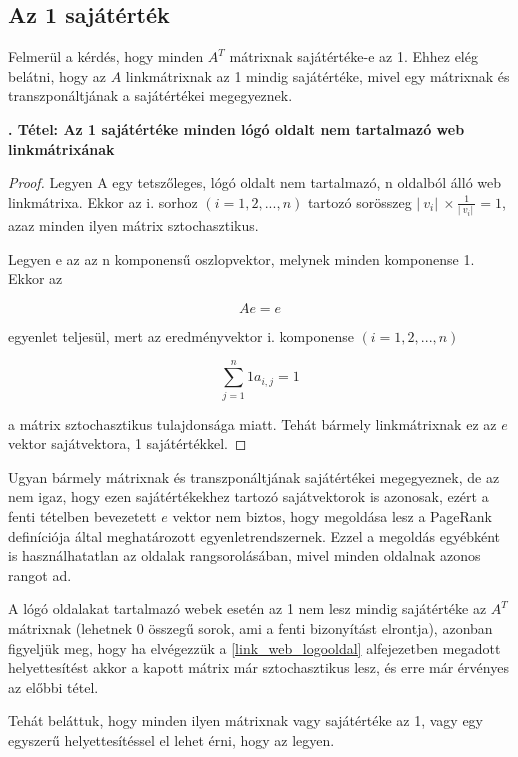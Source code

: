 \documentclass[12pt,a4paper]{article}
\newcounter{tszam}
\newenvironment{tetel}[1]
{{\medskip}\noindent \stepcounter{tszam}
{\bfseries{\thetszam. Tétel: #1\\[1ex]}}}{\bigskip }
\begin{document}
\subsection{Az 1 sajátérték}\label{egy_sajatertek}

Felmerül a kérdés, hogy minden $A^T$ mátrixnak sajátértéke-e az 1. Ehhez elég belátni, hogy az $A$ linkmátrixnak az 1 mindig sajátértéke, mivel egy mátrixnak és transzponáltjának a sajátértékei megegyeznek.

\begin{tetel}{Az 1 sajátértéke minden lógó oldalt nem tartalmazó web linkmátrixának}
\end{tetel}
\vspace{-1cm}
\begin{proof}
	Legyen A egy tetszőleges, lógó oldalt nem tartalmazó, n oldalból álló web linkmátrixa. Ekkor az i. sorhoz $(i = 1,2,...,n)$ tartozó sorösszeg $ |\ v_i |\ \times \frac{1}{|\ v_i |\ } = 1 $, azaz minden ilyen mátrix sztochasztikus.
	
	Legyen e az az n komponensű oszlopvektor, melynek minden komponense 1. Ekkor az
	
	\[ A e = e \] 
	
	egyenlet teljesül, mert az eredményvektor i. komponense $(i = 1,2,...,n)$
	
	\[ \sum_{j=1}^{n}{1 a_{i,j} } = 1 \] 
	
	a mátrix sztochasztikus tulajdonsága miatt. Tehát bármely linkmátrixnak ez az $e$ vektor sajátvektora, 1 sajátértékkel.
	
\end{proof}
\vspace{0.5cm}

Ugyan bármely mátrixnak és transzponáltjának sajátértékei megegyeznek, de az nem igaz, hogy ezen sajátértékekhez tartozó sajátvektorok is azonosak, ezért a fenti tételben bevezetett $e$ vektor nem biztos, hogy megoldása lesz a PageRank definíciója által meghatározott egyenletrendszernek. Ezzel a megoldás egyébként is használhatatlan az oldalak rangsorolásában, mivel minden oldalnak azonos rangot ad.

A lógó oldalakat tartalmazó webek esetén az 1 nem lesz mindig sajátértéke az $A^T$ mátrixnak (lehetnek 0 összegű sorok, ami a fenti bizonyítást elrontja), azonban figyeljük meg, hogy ha elvégezzük a \ref{link_web_logooldal} alfejezetben megadott helyettesítést akkor a kapott mátrix már sztochasztikus lesz, és erre már érvényes az előbbi tétel.

Tehát beláttuk, hogy minden ilyen mátrixnak vagy sajátértéke az 1, vagy egy egyszerű helyettesítéssel el lehet érni, hogy az legyen. 
\end{document}
